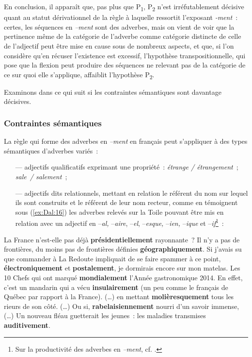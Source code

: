 \documentclass[output=paper]{langsci/langscibook}
\begin{document}
En conclusion, il apparaît que, pas plus que P\textsubscript{1}, P\textsubscript{2} n'est irréfutablement décisive quant au statut dérivationnel de la règle à laquelle ressortit l'exposant \emph{-ment~}: certes, les séquences en \emph{--ment} sont des adverbes, mais on vient de voir que la pertinence même de la catégorie de l'adverbe comme catégorie distincte de celle de l'adjectif peut être mise en cause sous de nombreux aspects, et que, si l'on considère qu'en récuser l'existence est excessif, l'hypothèse transpositionnelle, qui pose que la flexion peut produire des séquences ne relevant pas de la catégorie de ce sur quoi elle s'applique, affaiblit l'hypothèse P\textsubscript{2}.

Examinons dans ce qui suit si les contraintes sémantiques sont davantage décisives.

\subsubsection{Contraintes sémantiques}\label{section:dal:3.3.2}


La règle qui forme des adverbes en \emph{--ment} en français peut s'appliquer à des types sémantiques d'adverbes variés~:

\begin{itemize}
\item[---] adjectifs qualificatifs exprimant une propriété~: \emph{étrange / étrangement}~; \emph{sale~/ salement~};

\item[---] adjectifs dits relationnels, mettant en relation le référent du nom sur lequel ils sont construits et le référent de leur nom recteur, comme en témoignent sous (\ref{ex:Dal:16}) les adverbes relevés sur la Toile pouvant être mis en relation avec un adjectif en --\emph{al,} --\emph{aire}, --\emph{el}, --\emph{esque,} --\emph{ien,} --\emph{ique} et --\emph{if}\footnote{Sur la productivité des adverbes en \emph{--ment}, cf. %
\citet{Molinier92}%
%
.}~:

\end{itemize}

\ea\label{ex:Dal:16}
    \ea\label{ex:Dal:16a} La France n'est-elle pas déjà \textbf{présidentiellement} rayonnante~?
    \ex\label{ex:Dal:16b} Il n'y a pas de frontières, du moins pas de frontières définies \textbf{géographiquement}.
    \ex Si j'avais su que commander à La Redoute impliquait de se faire spammer à ce point, \textbf{électroniquement} et \textbf{postalement}, je dormirais encore sur mon matelas.
    \ex Les 10 Chefs qui ont marqué \textbf{mondialement} l'Année gastronomique 2014.
    \ex En effet, c'est un mandarin qui a vécu \textbf{insulairement} (un peu comme le français de Québec par rapport à la France).
    \ex (\ldots{}) en mettant \textbf{molièresquement} tous les rieurs de son côté.
    \ex (\ldots{}) Ou si, \textbf{rabelaisiennement} nourri d'un savoir immense, (\ldots{})
    \ex Un nouveau fléau guetterait les jeunes~: les maladies transmises \textbf{auditivement}.
\z\z
\end{document}
